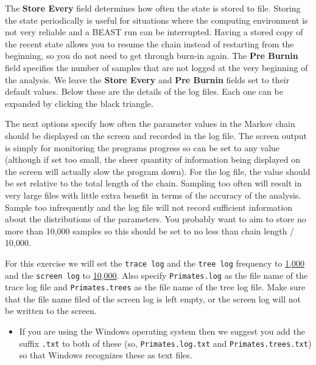 \documentclass[12pt]{article}
\newcommand{\includeimage}[2][]{%
\texttt{[image: \#2]}
}
\newcommand{\logEvery}{{1,000}}
\newcommand{\screenEvery}{{10,000}}
\begin{document}

The \textbf{Store Every} field determines how often the state is stored to file. Storing
the state periodically is useful for situations where the computing environment
is not very reliable and a BEAST run can be interrupted. Having a stored copy
of the recent state allows you to resume the chain instead of restarting from the
beginning, so you do not need to get through burn-in again.
The \textbf{Pre Burnin} field specifies the number of samples that are not logged at the very beginning of
the analysis. We leave the \textbf{Store Every} and \textbf{Pre Burnin} fields set to their default
values. Below these are the details of the log files. Each one can be expanded by
clicking the black triangle.

The next options specify how often the parameter values in the Markov
chain should be displayed on the screen and recorded in the log file.
The screen output is simply for monitoring the programs progress so
can be set to any value (although if set too small, the sheer quantity
of information being displayed on the screen will actually slow the
program down). For the log file, the value should be set relative
to the total length of the chain. Sampling too often will result in
very large files with little extra benefit in terms of the accuracy
of the analysis. Sample too infrequently and the log file will not
record sufficient information about the distributions of the parameters. 
You probably want to aim to store no more than 10,000 samples so this should be
set to no less than chain length / 10,000.

For this exercise we will set the \texttt{trace log} and the \texttt{tree log} frequency to \underline{\logEvery{}}
and the \texttt{screen log} to \underline{\screenEvery{}}.
Also specify \texttt{Primates.log} as the file name of the trace log file
and \texttt{Primates.trees} as the file name of the tree log file.
Make sure that the file name filed of the screen log is left empty,
or the screen log will not be written to the screen.

\begin{itemize}
\item If you are using the Windows operating system then we suggest you add the suffix \texttt{.txt} to both of these (so,
\texttt{Primates.log.txt} and \texttt{Primates.trees.txt}) so that Windows recognizes
these as text files. 
\end{itemize}
\end{document}
